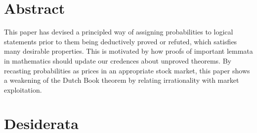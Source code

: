 \documentclass{article}
\begin{document}
\section{Abstract}

This paper has devised a principled way of assigning probabilities to logical statements prior to them being deductively proved or refuted, which satisfies many desirable properties. This is motivated by how proofs of important lemmata in mathematics should update our credences about unproved theorems. By recasting probabilities as prices in an appropriate stock market, this paper shows a weakening of the Dutch Book theorem by relating irrationality with market exploitation.

\section{Desiderata}
\end{document}
